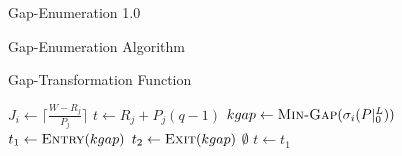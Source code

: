 \documentclass{beamer}
\begin{document}
\begin{section}{Gap-Enumeration 1.0}
\begin{frame}{Gap-Enumeration Algorithm\autocite[11]{BelwalCheng}}
  \begin{algorithm}[H]
    {\tiny
      \begin{algorithmic}[1]
            \State{$\sigma_{n}(P|_{0}^{L}) \gets \{[0,L)\}$}
              \EndIf
            \EndFor
            \State{$[t_{1},t_{2}) \gets \Call{Gap-Search}{\sigma_{j}(P|_{0}^{L}), C_{j}}$}
            \EndIf
            \EndIf
          \EndWhile
      \EndFunction
      \end{algorithmic}
    }
  \end{algorithm}
\end{frame}
\begin{frame}{Gap-Transformation Function\autocite[12]{BelwalCheng}}
  \begin{algorithm}[H]
  \begin{multicols}{2}
    {\tiny
      \begin{algorithmic}[2]
          \State $J_{i} \gets \lceil\frac{W - R_{j}}{P_{j}}\rceil$
            \State $t \gets R_{j} + P_{j}(q-1)$
            \State $kgap \gets \Call{Min-Gap}{\sigma_{i}(P|_{0}^{L})}$
            \State $t_{1} \gets \Call{Entry}{kgap}$
            \State $t_{2} \gets \Call{Exit}{kgap}$
                \State \Return $\emptyset$
              \EndIf
                \State $t \gets t_{1}$
              \EndIf
                \State \Call{Gap-Delete}{$\sigma_{i}(P|_{0}^{L}), [t_{1},t_{2})$}

\end{algorithmic}}
\end{multicols}
\end{algorithm}
\end{frame}
\end{section}
\end{document}
